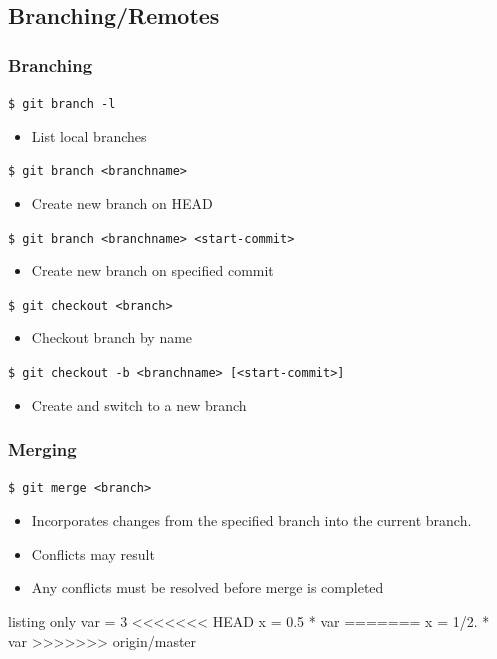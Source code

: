 \documentclass[english,compress]{beamer}
\begin{document}
\subsection{Branching/Remotes}
\begin{frame}[fragile]
    \frametitle{Branching}

    \verb|$ git branch -l|
    \begin{itemize}
        \item List local branches
    \end{itemize}

    \verb|$ git branch <branchname> |
    \begin{itemize}
        \item Create new branch on HEAD
    \end{itemize}

    \verb|$ git branch <branchname> <start-commit>|
    \begin{itemize}
        \item Create new branch on specified commit
    \end{itemize}

    \verb|$ git checkout <branch>|
    \begin{itemize}
        \item Checkout branch by name
    \end{itemize}

    \verb|$ git checkout -b <branchname> [<start-commit>]|
    \begin{itemize}
        \item Create and switch to a new branch
    \end{itemize}
\end{frame}

\begin{frame}[fragile]
    \frametitle{Merging}

    \verb|$ git merge <branch>|
    \begin{itemize}
        \item Incorporates changes from the specified branch into the current
            branch.
        \item Conflicts may result
        \item Any conflicts must be resolved before merge is completed
    \end{itemize}

    \begin{tcblisting}{listing only}
var = 3
<<<<<<< HEAD
x = 0.5 * var
=======
x = 1/2. * var
>>>>>>> origin/master
    \end{tcblisting}
\end{frame}
\end{document}
